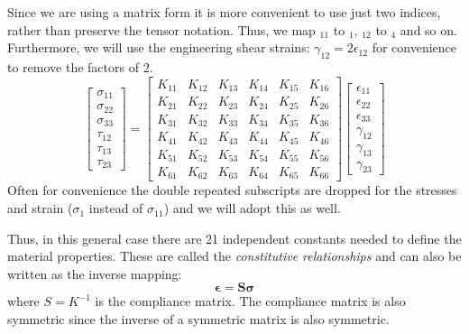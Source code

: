\documentclass{article}
\begin{document}
Since we are using a matrix form it is more convenient to use just two indices, rather than preserve the tensor notation.  Thus, we map $_{11}$ to $_{1}$, $_{12}$ to $_{4}$ and so on.  Furthermore, we will use the engineering shear strains: $\gamma_{12} = 2 \epsilon_{12}$ for convenience to remove the factors of 2.
\begin{equation}
\left[
\begin{matrix}
\sigma_{11}\\
\sigma_{22}\\
\sigma_{33}\\
\tau_{12}\\
\tau_{13}\\
\tau_{23}
\end{matrix}
\right]
=
\left[
\begin{matrix}
K_{11} & K_{12} & K_{13} & K_{14} & K_{15} & K_{16} \\
K_{21} & K_{22} & K_{23} & K_{24} & K_{25} & K_{26} \\
K_{31} & K_{32} & K_{33} & K_{34} & K_{35} & K_{36} \\
K_{41} & K_{42} & K_{43} & K_{44} & K_{45} & K_{46} \\
K_{51} & K_{52} & K_{53} & K_{54} & K_{55} & K_{56} \\
K_{61} & K_{62} & K_{63} & K_{64} & K_{65} & K_{66}
\end{matrix}
\right]
\left[
\begin{matrix}
\epsilon_{11}\\
\epsilon_{22}\\
\epsilon_{33}\\
\gamma_{12}\\
\gamma_{13}\\
\gamma_{23}
\end{matrix}
\right]
\end{equation}
Often for convenience the double repeated subscripts are dropped for the stresses and strain ($\sigma_1$ instead of $\sigma_{11}$) and we will adopt this as well.


Thus, in this general case there are 21 independent constants needed to define the material properties.
These are called the \emph{constitutive relationships} and can also be written as the inverse mapping:
\begin{equation}
\boldsymbol{\epsilon} = \boldsymbol{S} \boldsymbol{\sigma}
\end{equation}
where $S = K^{-1}$ is the compliance matrix.  The compliance matrix is also symmetric since the inverse of a symmetric matrix is also symmetric.
\end{document}
